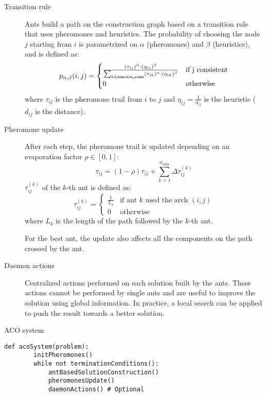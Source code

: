 \begin{description}
    \item[Transition rule] 
        Ants build a path on the construction graph based on a transition rule that uses pheromones and heuristics.
        The probability of choosing the node $j$ starting from $i$ 
        is parametrized on $\alpha$ (pheromones) and $\beta$ (heuristics), and is defined as:
        \[ p_{\alpha, \beta}(i, j) = \begin{cases}
            \frac{(\tau_{ij})^\alpha \cdot (\eta_{ij})^\beta}{\sum_{k \in \texttt{feasible\_nodes}} (\tau_{ik})^\alpha \cdot (\eta_{ik})^\beta} & \text{if } $j$ \text{ consistent} \\
            0 & \text{otherwise}
        \end{cases} \]
        where $\tau_{ij}$ is the pheromone trail from $i$ to $j$ and $\eta_{ij} = \frac{1}{d_{ij}}$ is the heuristic ($d_{ij}$ is the distance).

    \item[Pheromone update]
        After each step, the pheromone trail is updated depending on an evaporation factor $\rho \in [0, 1]$:
        \[ \tau_{ij} = (1 - \rho) \tau_{ij} + \sum_{k=1}^{n_\text{ants}} \Delta \tau_{ij}^{(k)} \]
        $\tau_{ij}^{(k)}$ of the $k$-th ant is defined as:
        \[ \tau_{ij}^{(k)} = \begin{cases}
            \frac{1}{L_k} & \text{if ant } k \text{ used the arch } (i, j) \\
            0 & \text{otherwise}
        \end{cases} \]
        where $L_k$ is the length of the path followed by the $k$-th ant.

        For the best ant, the update also affects all the components on the path crossed by the ant.

    \item[Daemon actions]
        Centralized actions performed on each solution built by the ants.
        These actions cannot be performed by single ants and are useful to improve the solution using global information.
        In practice, a local search can be applied to push the result towards a better solution.
\end{description} 

\begin{algorithm}
\caption{ACO system}
\begin{lstlisting}[mathescape=true]
    def acoSystem(problem):
        initPheromones()
        while not terminationConditions():
            antBasedSolutionConstruction()
            pheromonesUpdate()
            daemonActions() # Optional
\end{lstlisting}
\end{algorithm}



